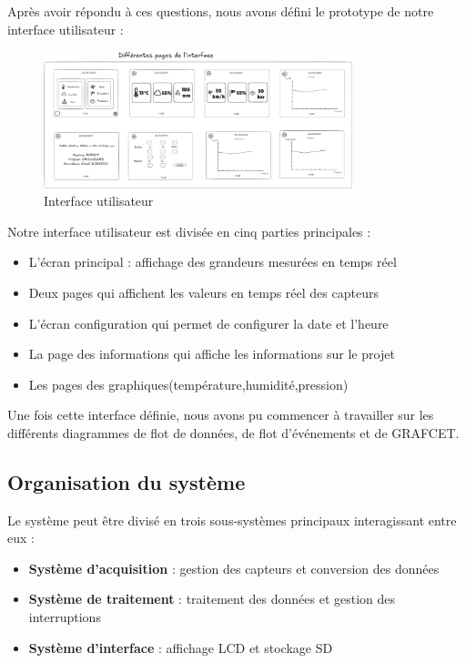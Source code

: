\documentclass[12pt]{article}
\begin{document}
Après avoir répondu à ces questions, nous avons défini le prototype de notre interface utilisateur :

\begin{figure}[H]
    \capstart
    \centering
    \includegraphics[width=0.8\textwidth]{./images/prototype_interface1.png}
    \caption{Interface utilisateur}
    \label{fig:interface}
\end{figure}

Notre interface utilisateur est divisée en cinq parties principales :
\begin{itemize}
    \item L'écran principal : affichage des grandeurs mesurées en temps réel
    \item Deux pages qui affichent les valeurs en temps réel des capteurs
    \item L'écran configuration qui permet de configurer la date et l'heure
    \item La page des informations qui affiche les informations sur le projet
    \item Les pages des graphiques(température,humidité,pression)
\end{itemize}

Une fois cette interface définie, nous avons pu commencer à travailler sur les différents diagrammes de flot de données, de flot d'événements et de GRAFCET.
\subsection{Organisation du système}
Le système peut être divisé en trois sous-systèmes principaux interagissant entre eux :
\begin{itemize}
    \item \textbf{Système d'acquisition} : gestion des capteurs et conversion des données
    \item \textbf{Système de traitement} : traitement des données et gestion des interruptions
    \item \textbf{Système d'interface} : affichage LCD et stockage SD
\end{itemize}
\end{document}
